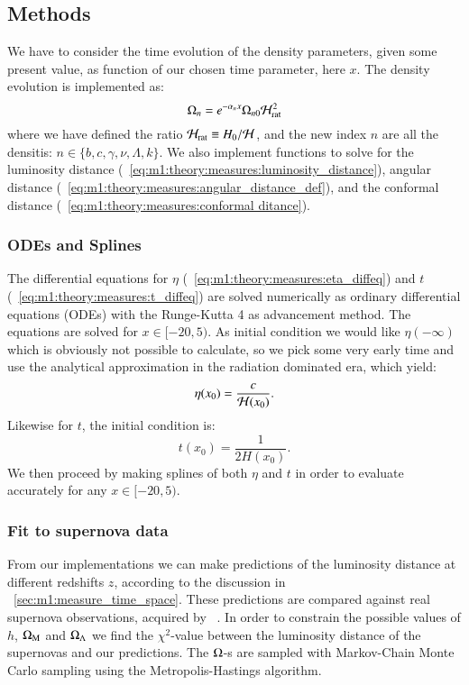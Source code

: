 \subsection{Methods}\label{sec:m1:methods}
    We have to consider the time evolution of the density parameters, given some present value, as function of our chosen time parameter, here $x$. The density evolution is implemented as:
    \begin{equation}\label{eq:m1:methods:initial:density_evolution}
        \Omega_n = e^{-\alpha_nx}\Omega_{n0}\mathcal{H}_\mathrm{rat}^2
    \end{equation}
    where we have defined the ratio $\mathcal{H}_\mathrm{rat} \equiv H_0/\mathcal{H}$, and the new index $n$ are all the densitis: $n\in\{b, c, \gamma, \nu, \Lambda, k\}$. We also implement functions to solve for the luminosity distance (~\cref{eq:m1:theory:measures:luminosity_distance}), angular distance (~\cref{eq:m1:theory:measures:angular_distance_def}), and the conformal distance (~\cref{eq:m1:theory:measures:conformal ditance}).


\subsubsection{ODEs and Splines}
    The differential equations for $\eta$ (~\cref{eq:m1:theory:measures:eta_diffeq}) and $t$ (~\cref{eq:m1:theory:measures:t_diffeq}) are solved numerically as ordinary differential equations (ODEs) with the Runge-Kutta 4 as advancement method. The equations are solved for $x\in[-20,5)$. As initial condition we would like $\eta(-\infty)$ which is obviously not possible to calculate, so we pick some very early time and use the analytical approximation in the radiation dominated era, which yield:
    \begin{equation}\label{eq:m1:methods:odes:eta_initial}
        \eta(x_0) = \frac{c}{\mathcal{H}(x_0)}.
    \end{equation}
    Likewise for $t$, the initial condition is:
    \begin{equation}\label{eq:m1:methods:odes:t_initial}
        t(x_0) = \frac{1}{2H(x_0)}.
    \end{equation}
    We then proceed by making splines of both $\eta$ and $t$ in order to evaluate accurately for any $x\in[-20,5)$. 

\subsubsection{Fit to supernova data}\label{sec:m1:methods:fit}
    From our implementations we can make predictions of the luminosity distance at different redshifts $z$, according to the discussion in ~\cref{sec:m1:measure_time_space}. These predictions are compared against real supernova observations, acquired by ~\cite{Betoule_2014}. In order to constrain the possible values of $h$, $\Omega_\mathrm{M}$ and $\Omega_\Lambda$ we find the $\chi^2$-value between the luminosity distance of the supernovas and our predictions. The $\Omega$-s are sampled with Markov-Chain Monte Carlo sampling using the Metropolis-Hastings algorithm. 
    
